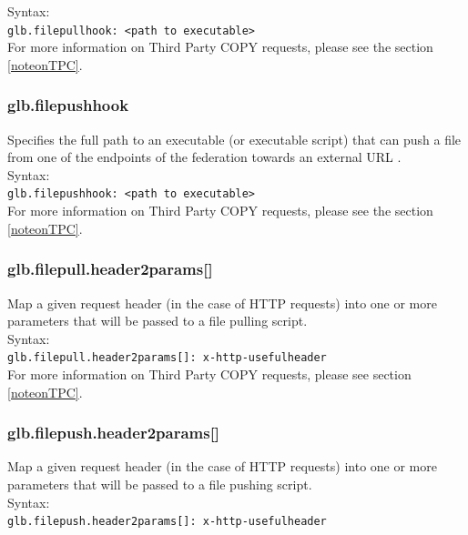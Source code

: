\documentclass[12pt]{article} %
\begin{document}
 Syntax:\\
 
 \lstinline"glb.filepullhook: <path to executable>"\\
 
 For more information on Third Party COPY requests, please see the section \ref{noteonTPC}.\\
 
\subsubsection{glb.filepushhook}
 Specifies the full path to an executable (or executable script) that can push a file from one of the endpoints of the federation towards an external URL .\\
 
 Syntax:\\
 
 \lstinline"glb.filepushhook: <path to executable>"\\
 
 For more information on Third Party COPY requests, please see the section \ref{noteonTPC}.\\
 
\subsubsection{glb.filepull.header2params[]}
 Map a given request header (in the case of HTTP requests) into one or more parameters that will be passed to a file pulling script.\\
 
 Syntax:\\
 
 \lstinline"glb.filepull.header2params[]: x-http-usefulheader"\\
 
  For more information on Third Party COPY requests, please see section \ref{noteonTPC}.\\
  
\subsubsection{glb.filepush.header2params[]}
 Map a given request header (in the case of HTTP requests) into one or more parameters that will be passed to a file pushing script.\\
 
 Syntax:\\
 
 \lstinline"glb.filepush.header2params[]: x-http-usefulheader"\\
 
\end{document}
